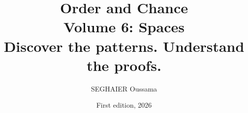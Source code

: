 \documentclass[11pt,openany]{book}
\title{\Huge\textbf{Order and Chance}\\[0.4em]\LARGE Volume 6: Spaces\\[0.6em]
\Large Discover the patterns. Understand the proofs.}
\author{SEGHAIER Oussama}
\date{First edition, 2026}
\begin{document}
\frontmatter
\makecover
\maketitle

\tableofcontents

\mainmatter













\end{document}
